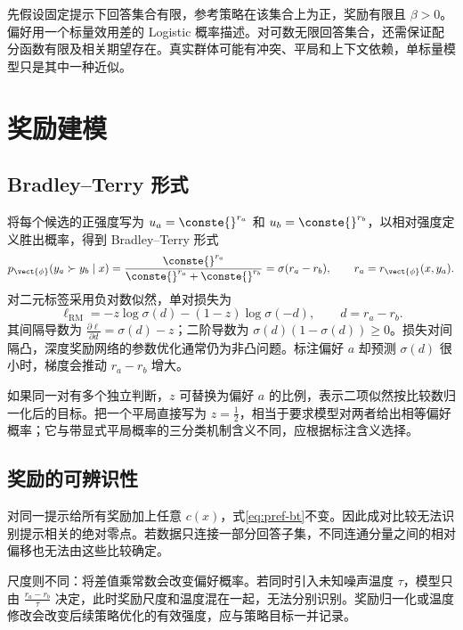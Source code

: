 \documentclass[../textbook.tex]{subfiles}
\begin{document}
\begin{assumption}[偏好与策略推导的范围]
先假设固定提示下回答集合有限，参考策略在该集合上为正，奖励有限且 $\beta>0$。偏好用一个标量效用差的 Logistic 概率描述。对可数无限回答集合，还需保证配分函数有限及相关期望存在。真实群体可能有冲突、平局和上下文依赖，单标量模型只是其中一种近似。
\end{assumption}

\section{奖励建模}

\subsection{Bradley--Terry 形式}
将每个候选的正强度写为 $u_a=\conste{}^{r_a}$ 和 $u_b=\conste{}^{r_b}$，以相对强度定义胜出概率，得到 Bradley--Terry 形式\autocite{bradley1952paired}
\begin{equation}
 p_{\vect{\phi}}(y_a\succ y_b\mid x)
 =\frac{\conste{}^{r_a}}{\conste{}^{r_a}+\conste{}^{r_b}}
 =\sigma(r_a-r_b),\qquad r_a=r_{\vect{\phi}}(x,y_a).
 \label{eq:pref-bt}
\end{equation}
对二元标签采用负对数似然，单对损失为
\begin{equation}
 \ell_{\mathrm{RM}}=-z\log\sigma(d)-(1-z)\log\sigma(-d),
 \qquad d=r_a-r_b.
 \label{eq:pref-rm-loss}
\end{equation}
其间隔导数为 $\frac{\partial\ell}{\partial d}=\sigma(d)-z$；二阶导数为 $\sigma(d)(1-\sigma(d))\ge0$。损失对间隔凸，深度奖励网络的参数优化通常仍为非凸问题。标注偏好 $a$ 却预测 $\sigma(d)$ 很小时，梯度会推动 $r_a-r_b$ 增大。

如果同一对有多个独立判断，$z$ 可替换为偏好 $a$ 的比例，表示二项似然按比较数归一化后的目标。把一个平局直接写为 $z=\frac{1}{2}$，相当于要求模型对两者给出相等偏好概率；它与带显式平局概率的三分类机制含义不同，应根据标注含义选择。

\subsection{奖励的可辨识性}
对同一提示给所有奖励加上任意 $c(x)$，式\eqref{eq:pref-bt}不变。因此成对比较无法识别提示相关的绝对零点。若数据只连接一部分回答子集，不同连通分量之间的相对偏移也无法由这些比较确定。

尺度则不同：将差值乘常数会改变偏好概率。若同时引入未知噪声温度 $\tau$，模型只由 $\frac{r_a-r_b}{\tau}$ 决定，此时奖励尺度和温度混在一起，无法分别识别。奖励归一化或温度修改会改变后续策略优化的有效强度，应与策略目标一并记录。
\end{document}
